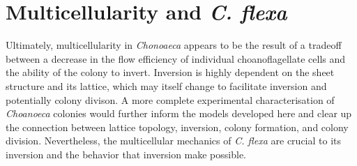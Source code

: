 \section{Multicellularity and \textit{C. flexa}}


Ultimately, multicellularity in \textit{Chonoaeca} appears to be the result of a tradeoff between a decrease in the flow efficiency of individual choanoflagellate cells and the ability of the colony to invert. 
Inversion is highly dependent on the sheet structure and its lattice, which may itself change to facilitate inversion and potentially colony divison. 
A more complete experimental characterisation of \textit{Choanoeca} colonies would further inform the models developed here and clear up the connection between lattice topology, inversion, colony formation, and colony division.
Nevertheless, the multicellular mechanics of \textit{C. flexa} are crucial to its inversion and the behavior that inversion make possible.
